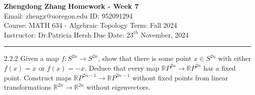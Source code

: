 \documentclass[a4paper, 12pt]{article}
\begin{document}
\noindent
\large\textbf{Zhengdong Zhang} \hfill \textbf{Homework - Week 7}   \\
Email: zhengz@uoregon.edu \hfill ID: 952091294 \\
\normalsize Course: MATH 634 - Algebraic Topology  \hfill Term: Fall 2024\\
Instructor: Dr.Patricia Hersh \hfill Due Date: $23^{th}$ November, 2024 \\
\noindent\rule{7in}{2.8pt}
\begin{problem}{2.2.2}
Given a map \(f:S^{2n}\rightarrow S^{2n}\), show that there is some point \(x\in S^{2n}\) with either \(f(x)=x\) or \(f(x)=-x\). Deduce that every map 
\(\mathbb{R}P^{2n}\rightarrow \mathbb{R}P^{2n}\) has a fixed point. Construct maps \(\mathbb{R}P^{2n-1}\rightarrow \mathbb{R}P^{2n-1}\) without fixed points from linear 
transformations \(\mathbb{R}^{2n}\rightarrow \mathbb{R}^{2n}\) without eigenvectors.
\end{problem}
\end{document}
